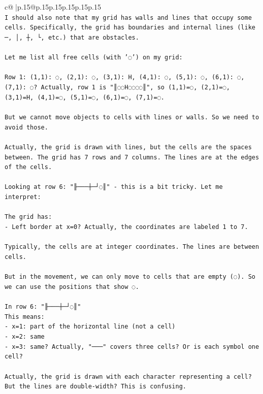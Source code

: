 \documentclass{article}
\begin{document}
{\begin{supertabular}{c@{$\;$}|p{.15\linewidth}@{}p{.15\linewidth}p{.15\linewidth}p{.15\linewidth}p{.15\linewidth}p{.15\linewidth}}
{{{\\ 
\texttt{I should also note that my grid has walls and lines that occupy some cells. Specifically, the grid has boundaries and internal lines (like ─, │, ┼, └, etc.) that are obstacles.} \\
\\ 
\texttt{Let me list all free cells (with '◌') on my grid:} \\
\\ 
\texttt{Row 1: (1,1): ◌, (2,1): ◌, (3,1): H, (4,1): ◌, (5,1): ◌, (6,1): ◌, (7,1): ◌? Actually, row 1 is "║◌◌H◌◌◌◌║", so (1,1)=◌, (2,1)=◌, (3,1)=H, (4,1)=◌, (5,1)=◌, (6,1)=◌, (7,1)=◌.} \\
\\ 
\texttt{But we cannot move objects to cells with lines or walls. So we need to avoid those.} \\
\\ 
\texttt{Actually, the grid is drawn with lines, but the cells are the spaces between. The grid has 7 rows and 7 columns. The lines are at the edges of the cells.} \\
\\ 
\texttt{Looking at row 6: "╟───┼─┘◌║" {-} this is a bit tricky. Let me interpret:} \\
\\ 
\texttt{The grid has:} \\
\texttt{{-} Left border at x=0? Actually, the coordinates are labeled 1 to 7.} \\
\\ 
\texttt{Typically, the cells are at integer coordinates. The lines are between cells.} \\
\\ 
\texttt{But in the movement, we can only move to cells that are empty (◌). So we can use the positions that show ◌.} \\
\\ 
\texttt{In row 6: "╟───┼─┘◌║"} \\
\texttt{This means:} \\
\texttt{{-} x=1: part of the horizontal line (not a cell)} \\
\texttt{{-} x=2: same} \\
\texttt{{-} x=3: same? Actually, "───" covers three cells? Or is each symbol one cell?} \\
\\ 
\texttt{Actually, the grid is drawn with each character representing a cell? But the lines are double{-}width? This is confusing.} \\
\\ 
}}}
\end{supertabular}}
\end{document}
